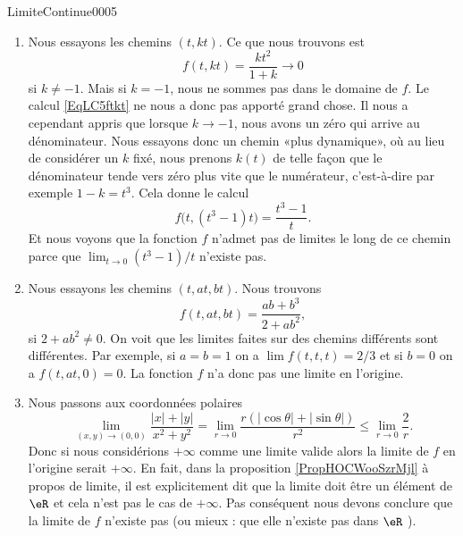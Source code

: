 \begin{corrige}{LimiteContinue0005}

	\begin{enumerate}
		\item
			Nous essayons les chemins $(t,kt)$. Ce que nous trouvons est
			\begin{equation}		\label{EqLC5ftkt}
				f(t,kt)=\frac{ kt^2 }{ 1+k }\to 0
			\end{equation}
			si $k\neq -1$. Mais si $k=-1$, nous ne sommes pas dans le domaine de $f$. Le calcul \eqref{EqLC5ftkt} ne nous a donc pas apporté grand chose. Il nous a cependant appris que lorsque $k\to -1$, nous avons un zéro qui arrive au dénominateur. Nous essayons donc un chemin «plus dynamique», où au lieu de considérer un $k$ fixé, nous prenons $k(t)$ de telle façon que le dénominateur tende vers zéro plus vite que le numérateur, c'est-à-dire par exemple $1-k=t^3$. Cela donne le calcul
			\begin{equation}
				f\big( t,(t^3-1)t \big)=\frac{ t^3-1 }{ t }.
			\end{equation}
			Et nous voyons que la fonction $f$ n'admet pas de limites le long de ce chemin parce que $\lim_{t\to 0} (t^3-1)/t$ n'existe pas.
                        \item Nous essayons les chemins $(t, at, bt)$. Nous trouvons
                          \begin{equation}
                            f(t,at,bt) = \frac{ab+b^3}{2+ab^2},
                          \end{equation}
                          si $2+ab^2\neq 0$. On voit que les limites faites sur des chemins différents sont différentes. Par exemple, si $a=b=1$ on a $\lim f (t,t,t)= 2/3$ et si $b=0$ on a $f(t,at, 0)= 0$. La fonction $f$ n'a donc pas une limite en l'origine.
                          \item Nous passons aux coordonnées polaires
                            \begin{equation}
                              \lim_{(x,y)\to (0,0)}\frac{|x|+|y|}{x^2+y^2}=\lim_{r\to 0}\frac{r(|\cos \theta|+|\sin \theta|)}{r^2}\leq \lim_{r\to 0} \frac{2}{r}. 
                            \end{equation}
                            Donc si nous considérions $+\infty$ comme une limite valide alors  la limite de $f$ en l'origine  serait $+\infty$. En fait, dans la proposition \ref{PropHOCWooSzrMjl} à propos de limite, il est explicitement dit que la limite doit être un élément de $\eR$ et cela n'est pas le cas de $+\infty$. Pas conséquent nous devons conclure que la limite de $f$  n'existe pas (ou mieux : que elle n'existe pas dans $\eR$ ). 

\end{enumerate}
\end{corrige}
